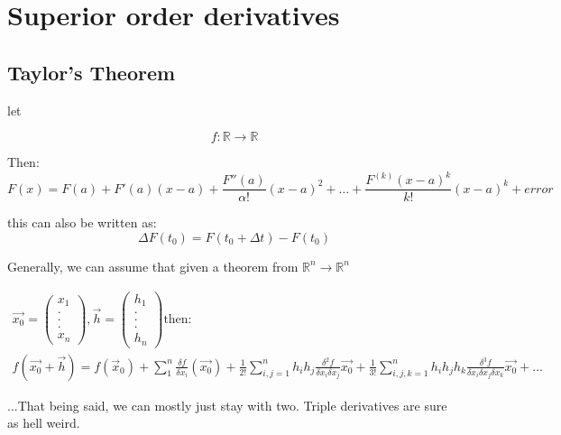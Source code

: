 \documentclass[11pt,fleqn]{book} %
\begin{document}

\chapter{Superior order derivatives}

\section{Taylor's Theorem}
let

$$ f: \mathbb{R} \to \mathbb{R} $$

Then:
\begin{equation}
    F(x) = F(a) + F'(a) (x-a) + \frac{F''(a)}{\alpha !} (x-a)^2 + \dots + \frac{F^{(k)}(x-a)^k}{k!} (x-a)^k + error    
\end{equation}

this can also be written as:
\begin{equation}
    \Delta F(t_0) = F(t_0+\Delta t) - F(t_0)
\end{equation}

Generally, we can assume that given a theorem from $\mathbb{R}^n \to \mathbb{R}^n$

\begin{gather}
    \vec{x_0} = \begin{pmatrix}
        x_1 \\
        . \\
        . \\
        . \\
        x_n
    \end{pmatrix} ,
    \vec{h} = \begin{pmatrix}
        h_1 \\
        . \\
        . \\
        . \\
        h_n
    \end{pmatrix} \text{then:} \\
    f(\vec{x_0}+ \vec{h}) = f(\vec{x}_0) + \sum_{1}^{n} \frac{\delta f}{\delta x_i}(\vec{x_0}) + \frac{1}{2!} \sum_{i,j = 1}^{n} h_i h_j \frac{\delta^2 f}{\delta x_i \delta x_j} \vec{x_0} +  
    \frac{1}{3!} \sum_{i,j,k = 1}^{n} h_i h_j h_k \frac{\delta^3 f}{\delta x_i \delta x_j \delta x_k} \vec{x_0} + \dots 
\end{gather}

...That being said, we can mostly just stay with two. Triple derivatives are sure as hell weird. 
\end{document}
